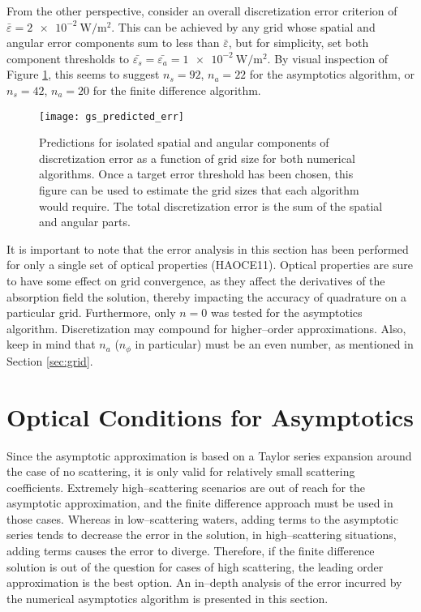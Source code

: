 From the other perspective, consider an overall discretization error criterion of $\bar{\varepsilon}=\SI{2e-2}{\W\per\m\squared}$.
This can be achieved by any grid whose spatial and angular error components sum to less than $\bar{\varepsilon}$, but for simplicity, set both component thresholds to $\bar{\varepsilon_s}=\bar{\varepsilon_a}=\SI{1e-2}{\W\per\m\squared}$.
By visual inspection of Figure \ref{fig:gs_predicted_err}, this seems to suggest $n_s=92$, $n_a=22$ for the asymptotics algorithm, or $n_s=42$, $n_a=20$ for the finite difference algorithm.

\begin{figure}[H]
  \centering
  \texttt{[image: gs\_predicted\_err]}
  \caption{Predictions for isolated spatial and angular components of discretization error as a function of grid size for both numerical algorithms. Once a target error threshold has been chosen, this figure can be used to estimate the grid sizes that each algorithm would require. The total discretization error is the sum of the spatial and angular parts.}
  \label{fig:gs_predicted_err}
\end{figure}

It is important to note that the error analysis in this section has been performed for only a single set of optical properties (HAOCE11).
Optical properties are sure to have some effect on grid convergence, as they affect the derivatives of the absorption field the solution, thereby impacting the accuracy of quadrature on a particular grid.
Furthermore, only $n=0$ was tested for the asymptotics algorithm.
Discretization may compound for higher--order approximations.
Also, keep in mind that $n_a$ ($n_\phi$ in particular) must be an even number, as mentioned in Section \ref{sec:grid}.

\section{Optical Conditions for Asymptotics}
Since the asymptotic approximation is based on a Taylor series expansion around the case of no scattering, it is only valid for relatively small scattering coefficients.
Extremely high--scattering scenarios are out of reach for the asymptotic approximation, and the finite difference approach must be used in those cases.
Whereas in low--scattering waters, adding terms to the asymptotic series tends to decrease the error in the solution, in high--scattering situations, adding terms causes the error to diverge.
Therefore, if the finite difference solution is out of the question for cases of high scattering, the leading order approximation is the best option.
An in--depth analysis of the error incurred by the numerical asymptotics algorithm is presented in this section.

